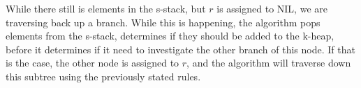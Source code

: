 While there still is elements in the s-stack, but $r$ is assigned to NIL, we are traversing back up a branch. While this is happening, the algorithm pops elements from the s-stack, determines if they should be added to the k-heap, before it determines if it need to investigate the other branch of this node. If that is the case, the other node is assigned to $r$, and the algorithm will traverse down this subtree using the previously stated rules.











